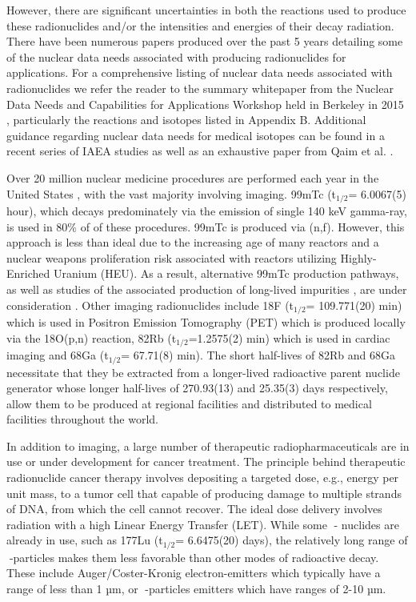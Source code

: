 \documentclass[letterpaper,draft]{ar-1col}
\begin{document}
However, there are significant uncertainties in both the reactions used to produce these radionuclides and/or the intensities and energies of their decay radiation.  There have been numerous papers produced over the past 5 years detailing some of the nuclear data needs associated with producing radionuclides for applications. For a comprehensive listing of nuclear data needs associated with radionuclides we refer the reader to the summary whitepaper from the Nuclear Data Needs and Capabilities for Applications Workshop held in Berkeley in 2015 \cite{Ndn15}, particularly the reactions and isotopes listed in Appendix B.  Additional guidance regarding nuclear data needs for medical isotopes can be found in a recent series of IAEA studies \cite{Iae675,Iae596,Iae591} as well as an exhaustive paper from Qaim et al. \cite{Qai17}.

Over 20 million nuclear medicine procedures are performed each year in the United States \cite{Met09}, with the vast majority involving imaging.  99mTc (t$_{1/2}$= 6.0067(5) hour), which decays predominately via the emission of single 140 keV gamma-ray, is used in 80\% of of these procedures. 99mTc is produced via (n,f).  However, this approach is less than ideal due to the increasing age of many reactors \cite{Qai12} and a nuclear weapons proliferation risk associated with reactors utilizing Highly-Enriched Uranium (HEU).  As a result, alternative 99mTc production pathways, as well as studies of the associated production of long-lived impurities \cite{Upd13}, are under consideration \cite{Rut09}. Other imaging radionuclides include 18F (t$_{1/2}$= 109.771(20) min) which is used in Positron Emission Tomography (PET) which is produced locally via the 18O(p,n) reaction, 82Rb (t$_{1/2}$=1.2575(2) min) which is used in cardiac imaging and 68Ga  (t$_{1/2}$= 67.71(8) min).  The short half-lives of 82Rb and 68Ga necessitate that they be extracted from a longer-lived radioactive parent nuclide generator whose longer half-lives of 270.93(13) and 25.35(3) days respectively, allow them to be produced at regional facilities and distributed to medical facilities throughout the world.  

In addition to imaging, a large number of therapeutic radiopharmaceuticals are in use or under development for cancer treatment.  The principle behind therapeutic radionuclide cancer therapy involves depositing a targeted dose, e.g., energy per unit mass, to a tumor cell that capable of producing damage to multiple strands of DNA, from which the cell cannot recover.  The ideal dose delivery involves radiation with a high Linear Energy Transfer (LET).  While some - nuclides are already in use, such as 177Lu (t$_{1/2}$= 6.6475(20) days), the relatively long range of -particles makes them less favorable than other modes of radioactive decay.  These include Auger/Coster-Kronig electron-emitters which typically have a range of less than 1 µm, or -particles emitters which have ranges of 2-10 µm.  
\end{document}
